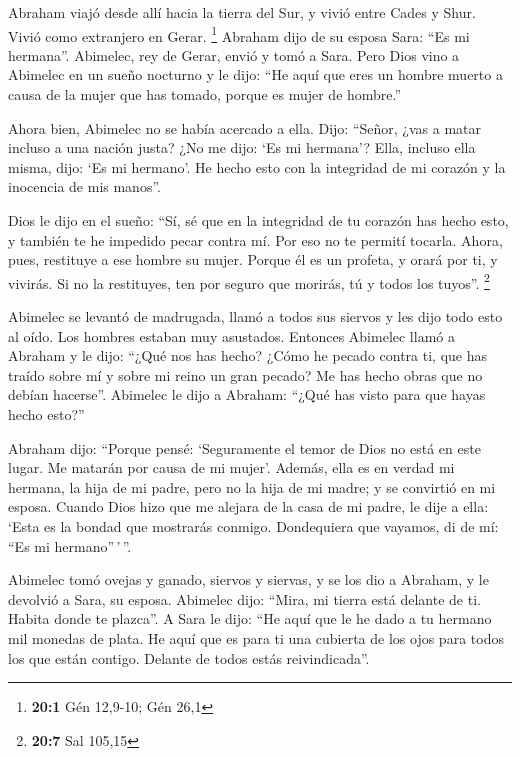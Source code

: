 \begin{paracol}{2}
 Abraham viajó desde allí hacia la tierra del Sur, y vivió
entre Cades y Shur. Vivió como extranjero en Gerar. \footnote{\textbf{20:1}
  Gén 12,9-10; Gén 26,1}  Abraham dijo de su esposa Sara:
``Es mi hermana''. Abimelec, rey de Gerar, envió y tomó a Sara.
 Pero Dios vino a Abimelec en un sueño nocturno y le dijo:
``He aquí que eres un hombre muerto a causa de la mujer que has tomado,
porque es mujer de hombre.''

 Ahora bien, Abimelec no se había acercado a ella. Dijo:
``Señor, ¿vas a matar incluso a una nación justa?  ¿No me
dijo: `Es mi hermana'? Ella, incluso ella misma, dijo: `Es mi hermano'.
He hecho esto con la integridad de mi corazón y la inocencia de mis
manos''.

 Dios le dijo en el sueño: ``Sí, sé que en la integridad
de tu corazón has hecho esto, y también te he impedido pecar contra mí.
Por eso no te permití tocarla.  Ahora, pues, restituye a
ese hombre su mujer. Porque él es un profeta, y orará por ti, y vivirás.
Si no la restituyes, ten por seguro que morirás, tú y todos los tuyos''.
\footnote{\textbf{20:7} Sal 105,15}

 Abimelec se levantó de madrugada, llamó a todos sus
siervos y les dijo todo esto al oído. Los hombres estaban muy asustados.
 Entonces Abimelec llamó a Abraham y le dijo: ``¿Qué nos
has hecho? ¿Cómo he pecado contra ti, que has traído sobre mí y sobre mi
reino un gran pecado? Me has hecho obras que no debían hacerse''.
 Abimelec le dijo a Abraham: ``¿Qué has visto para que
hayas hecho esto?''

 Abraham dijo: ``Porque pensé: `Seguramente el temor de
Dios no está en este lugar. Me matarán por causa de mi mujer'.
 Además, ella es en verdad mi hermana, la hija de mi
padre, pero no la hija de mi madre; y se convirtió en mi esposa.
 Cuando Dios hizo que me alejara de la casa de mi padre,
le dije a ella: `Esta es la bondad que mostrarás conmigo. Dondequiera
que vayamos, di de mí: ``Es mi hermano''\,'\,''.

 Abimelec tomó ovejas y ganado, siervos y siervas, y se
los dio a Abraham, y le devolvió a Sara, su esposa. 
Abimelec dijo: ``Mira, mi tierra está delante de ti. Habita donde te
plazca''.  A Sara le dijo: ``He aquí que le he dado a tu
hermano mil monedas de plata. He aquí que es para ti una cubierta de los
ojos para todos los que están contigo. Delante de todos estás
reivindicada''.


\end{paracol}

